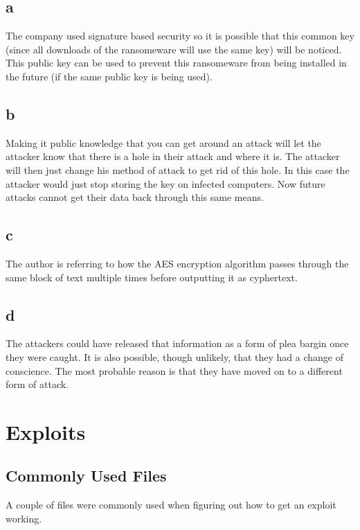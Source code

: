 \documentclass{article}
\begin{document}
	\subsection*{a} %
	\label{sub:a}
	The company used signature based security so it is possible that this common key (since all downloads of the ransomeware will use the same key) will be noticed. This public key can be used to prevent this ransomeware from being installed in the future (if the same public key is being used).

	\subsection*{b} %
	\label{sub:b}
	Making it public knowledge that you can get around an attack will let the attacker know that there is a hole in their attack and where it is. The attacker will then just change his method of attack to get rid of this hole. In this case the attacker would just stop storing the key on infected computers. Now future attacks cannot get their data back through this same means.

	\subsection*{c} %
	\label{sub:c}
	The author is referring to how the AES encryption algorithm passes through the same block of text multiple times before outputting it as cyphertext.

	\subsection*{d} %
	\label{sub:d}
	The attackers could have released that information as a form of plea bargin once they were caught. It is also possible, though unlikely, that they had a change of conscience. The most probable reason is that they have moved on to a different form of attack.	



\section*{Exploits} %
\label{sec:exploits}
	\subsection*{Commonly Used Files} %
	\label{sub:commonly_used_files}
	A couple of files were commonly used when figuring out how to get an exploit working. 
\end{document}
